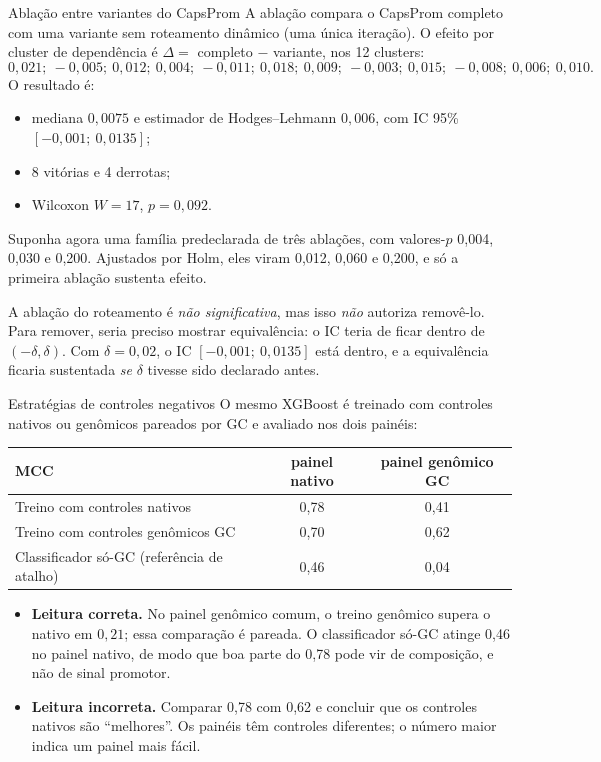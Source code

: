 \documentclass[11pt,a4paper]{article}
\begin{document}
\begin{exemplo}{Ablação entre variantes do CapsProm}
A ablação compara o CapsProm completo com uma variante sem roteamento dinâmico (uma única iteração). O efeito por cluster de dependência é $\Delta=$ completo $-$ variante, nos 12 clusters:
\[
0{,}021;\ -0{,}005;\ 0{,}012;\ 0{,}004;\ -0{,}011;\ 0{,}018;\ 0{,}009;\ -0{,}003;\ 0{,}015;\ -0{,}008;\ 0{,}006;\ 0{,}010.
\]
O resultado é:
\begin{itemize}[leftmargin=1.2em]
\item mediana $0{,}0075$ e estimador de Hodges--Lehmann $0{,}006$, com IC 95\% $[-0{,}001;\ 0{,}0135]$;
\item 8 vitórias e 4 derrotas;
\item Wilcoxon $W=17$, $p=0{,}092$.
\end{itemize}

Suponha agora uma família predeclarada de três ablações, com valores-$p$ 0,004, 0,030 e 0,200. Ajustados por Holm, eles viram 0,012, 0,060 e 0,200, e só a primeira ablação sustenta efeito.

A ablação do roteamento é \emph{não significativa}, mas isso \emph{não} autoriza removê-lo. Para remover, seria preciso mostrar equivalência: o IC teria de ficar dentro de $(-\delta,\delta)$. Com $\delta=0{,}02$, o IC $[-0{,}001;\ 0{,}0135]$ está dentro, e a equivalência ficaria sustentada \emph{se} $\delta$ tivesse sido declarado antes.
\end{exemplo}

\begin{exemplo}{Estratégias de controles negativos}
O mesmo XGBoost é treinado com controles nativos ou genômicos pareados por GC e avaliado nos dois painéis:
\begin{center}\small
\begin{tabular}{lcc}
\toprule
MCC & painel nativo & painel genômico GC \\
\midrule
Treino com controles nativos & 0,78 & 0,41 \\
Treino com controles genômicos GC & 0,70 & 0,62 \\
Classificador só-GC (referência de atalho) & 0,46 & 0,04 \\
\bottomrule
\end{tabular}
\end{center}
\begin{itemize}[leftmargin=1.2em]
\item \textbf{Leitura correta.} No painel genômico comum, o treino genômico supera o nativo em $0{,}21$; essa comparação é pareada. O classificador só-GC atinge 0,46 no painel nativo, de modo que boa parte do 0,78 pode vir de composição, e não de sinal promotor.
\item \textbf{Leitura incorreta.} Comparar 0,78 com 0,62 e concluir que os controles nativos são ``melhores''. Os painéis têm controles diferentes; o número maior indica um painel mais fácil.
\end{itemize}
\end{exemplo}
\end{document}
